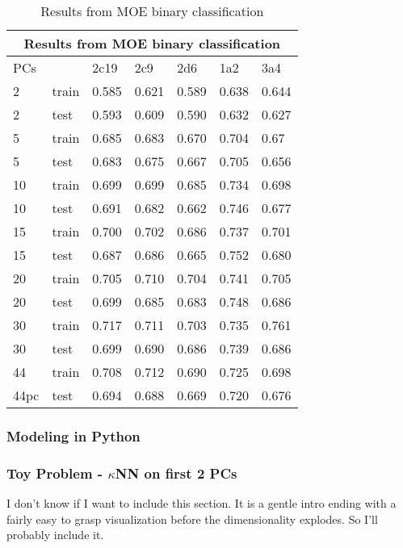 \begin{table}[!htbp]
\begin{tabular}{|l|l|l|l|l|l|l|}
\hline
\multicolumn{7}{|c|}{Results from MOE binary classification}                        \\ \hline
PCs  &       & 2c19  & 2c9   & 2d6   & 1a2   & 3a4   \\ \hline
2    & train & 0.585 & 0.621 & 0.589 & 0.638 & 0.644 \\ \hline
2    & test  & 0.593 & 0.609 & 0.590 & 0.632 & 0.627 \\ \hline
5    & train & 0.685 & 0.683 & 0.670 & 0.704 & 0.67  \\ \hline
5    & test  & 0.683 & 0.675 & 0.667 & 0.705 & 0.656 \\ \hline
10   & train & 0.699 & 0.699 & 0.685 & 0.734 & 0.698 \\ \hline
10   & test  & 0.691 & 0.682 & 0.662 & 0.746 & 0.677 \\ \hline
15   & train & 0.700 & 0.702 & 0.686 & 0.737 & 0.701 \\ \hline
15   & test  & 0.687 & 0.686 & 0.665 & 0.752 & 0.680 \\ \hline
20   & train & 0.705 & 0.710 & 0.704 & 0.741 & 0.705 \\ \hline
20   & test  & 0.699 & 0.685 & 0.683 & 0.748 & 0.686 \\ \hline
30   & train & 0.717 & 0.711 & 0.703 & 0.735 & 0.761 \\ \hline
30   & test  & 0.699 & 0.690 & 0.686 & 0.739 & 0.686 \\ \hline
44   & train & 0.708 & 0.712 & 0.690 & 0.725 & 0.698 \\ \hline
44pc & test  & 0.694 & 0.688 & 0.669 & 0.720 & 0.676 \\ \hline
\end{tabular}
\caption{Results from MOE binary classification}
\end{table}

\subsubsection{Modeling in Python}
\subsubsection{Toy Problem - $\kappa$NN on first 2 PCs}
I don't know if I want to include this section. It is a gentle intro ending with a fairly easy to grasp visualization before the dimensionality explodes. So I'll probably include it.

